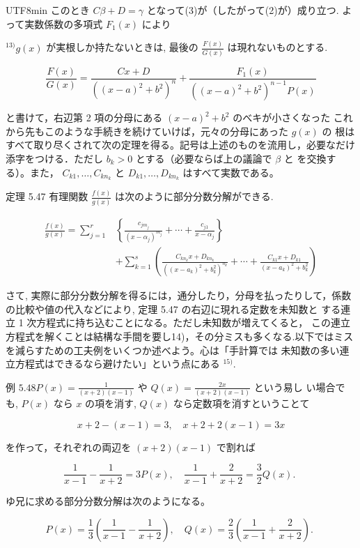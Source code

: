 \documentclass[10pt]{article}
\begin{document}
\begin{CJK}{UTF8}{min}
このとき $C \beta+D=\gamma$ となって(3)が（したがって(2)が）成り立つ. よって実数係数の多項式 $F_{1}(x)$ により

${ }^{13)} g(x)$ が実根しか持たないときは, 最後の $\frac{F(x)}{G(x)}$ は現れないものとする.

$$
\frac{F(x)}{G(x)}=\frac{C x+D}{\left((x-a)^{2}+b^{2}\right)^{n}}+\frac{F_{1}(x)}{\left((x-a)^{2}+b^{2}\right)^{n-1} P(x)}
$$

と書けて，右辺第 2 項の分母にある $(x-a)^{2}+b^{2}$ のべキが小さくなった これから先もこのような手続きを続けていけば，元々の分母にあった $g(x)$ の 根はすべて取り尽くされて次の定理を得る。記号は上述のものを流用し，必要なだけ添字をつける．ただし $b_{k}>0$ とする（必要ならば上の議論で $\beta$ と を交換する）。また， $C_{k 1}, \ldots, C_{k n_{k}}$ と $D_{k 1}, \ldots, D_{k n_{k}}$ はすべて実数である。

定理 5.47 有理関数 $\frac{f(x)}{g(x)}$ は次のように部分分数分解ができる.

$$
\begin{aligned}
\frac{f(x)}{g(x)}=\sum_{j=1}^{r} & \left\{\frac{c_{j m_{j}}}{\left(x-\alpha_{j}\right)^{m_{j}}}+\cdots+\frac{c_{j 1}}{x-\alpha_{j}}\right\} \\
& +\sum_{k=1}^{s}\left(\frac{C_{k n_{k}} x+D_{k n_{k}}}{\left(\left(x-a_{k}\right)^{2}+b_{k}^{2}\right)^{n_{k}}}+\cdots+\frac{C_{k 1} x+D_{k 1}}{\left(x-a_{k}\right)^{2}+b_{k}^{2}}\right)
\end{aligned}
$$

さて, 実際に部分分数分解を得るには，通分したり，分母を払ったりして，係数の比較や値の代入などにより, 定理 5.47 の右辺に現れる定数を未知数と する連立 1 次方程式に持ち込むことになる。ただし未知数が増えてくると， この連立方程式を解くことは結構な手間を要し14)，その分ミスも多くなる.以下ではミスを減らすための工夫例をいくつか述べよう。心は「手計算では 未知数の多い連立方程式はできるなら避けたい」という点にある ${ }^{15)}$.

例 $5.48 P(x)=\frac{1}{(x+2)(x-1)}$ や $Q(x)=\frac{2 x}{(x+2)(x-1)}$ という易し い場合でも, $P(x)$ なら $x$ の項を消す, $Q(x)$ なら定数項を消すということて

$$
x+2-(x-1)=3, \quad x+2+2(x-1)=3 x
$$

を作って，それぞれの両辺を $(x+2)(x-1)$ で割れば

$$
\frac{1}{x-1}-\frac{1}{x+2}=3 P(x), \quad \frac{1}{x-1}+\frac{2}{x+2}=\frac{3}{2} Q(x) \text {. }
$$


ゆ兄に求める部分分数分解は次のようになる。

$$
P(x)=\frac{1}{3}\left(\frac{1}{x-1}-\frac{1}{x+2}\right), \quad Q(x)=\frac{2}{3}\left(\frac{1}{x-1}+\frac{2}{x+2}\right) \text {. }
$$


\end{CJK}
\end{document}
